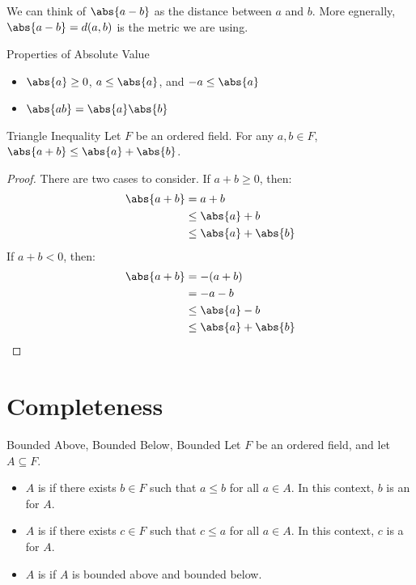 We can think of $\abs{a-b}$ as the distance between $a$ and $b$. More egnerally, $\abs{a-b} = d(a,b)$ is the metric we are using.

\begin{thmbox}{Properties of Absolute Value}{}
    \begin{itemize}
        \item $\abs{a} \geq 0$, $a \leq \abs{a}$, and $-a \leq \abs{a}$
        \item $\abs{ab} = \abs{a}\abs{b}$
    \end{itemize}
\end{thmbox}

\begin{thmbox}{Triangle Inequality}{}
    Let $F$ be an ordered field. For any $a,b \in F$, $\abs{a+b} \leq \abs{a} + \abs{b}$.
    \tcblower
    \begin{proof}
        There are two cases to consider. If $a+b \geq 0$, then:
        \begin{align*}
            \abs{a+b}
            &= a+b \\
            &\leq \abs{a} + b \\
            &\leq \abs{a} + \abs{b}
        \end{align*}
        If $a+b < 0$, then:
        \begin{align*}
            \abs{a+b}
            &= -(a+b) \\
            &= -a-b \\
            &\leq \abs{a} - b \\
            &\leq \abs{a} + \abs{b}
        \end{align*}
    \end{proof}
\end{thmbox}

\section{Completeness}

\begin{dfnbox}{Bounded Above, Bounded Below, Bounded}{}
    Let $F$ be an ordered field, and let $A \subseteq F$.
    \begin{itemize}[noitemsep]
        \item $A$ is  if there exists $b \in F$ such that $a \leq b$ for all $a \in A$. In this context, $b$ is an  for $A$.
        \item $A$ is  if there exists $c \in F$ such that $c \leq a$ for all $a \in A$. In this context, $c$ is a  for $A$.
        \item $A$ is  if $A$ is bounded above and bounded below.
    \end{itemize}
\end{dfnbox}

